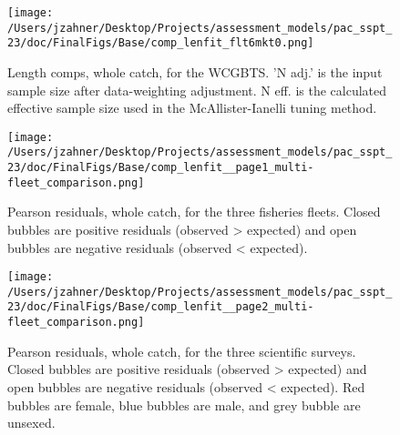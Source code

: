 \documentclass[11pt,
  letterpaper,
]{article}
\begin{document}
\begin{figure}
{\centering
\texttt{[image: /Users/jzahner/Desktop/Projects/assessment\_models/pac\_sspt\_23/doc/FinalFigs/Base/comp\_lenfit\_flt6mkt0.png]}
}
\caption{Length comps, whole catch, for the WCGBTS. 'N adj.' is the input sample size after data-weighting adjustment. N eff. is the calculated effective sample size used in the McAllister-Ianelli tuning method.\label{fig:fits_wcgbts}}
\end{figure}

\begin{figure}
{\centering
\texttt{[image: /Users/jzahner/Desktop/Projects/assessment\_models/pac\_sspt\_23/doc/FinalFigs/Base/comp\_lenfit\_\_page1\_multi-fleet\_comparison.png]}
}
\caption{Pearson residuals, whole catch, for the three fisheries fleets. Closed bubbles are positive residuals (observed > expected) and open bubbles are negative residuals (observed < expected).\label{fig:resids_fisheries}}
\end{figure}

\begin{figure}
{\centering
\texttt{[image: /Users/jzahner/Desktop/Projects/assessment\_models/pac\_sspt\_23/doc/FinalFigs/Base/comp\_lenfit\_\_page2\_multi-fleet\_comparison.png]}
}
\caption{Pearson residuals, whole catch, for the three scientific surveys. Closed bubbles are positive residuals (observed > expected) and open bubbles are negative residuals (observed < expected). Red bubbles are female, blue bubbles are male, and grey bubble are unsexed.\label{fig:resids_survey}}
\end{figure}
\end{document}
